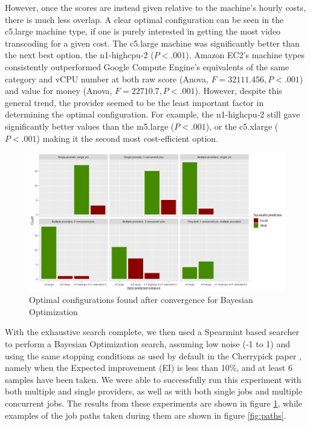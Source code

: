 \documentclass{article}
\begin{document}
However, once the scores are instead given relative to the machine's hourly costs, there is much less overlap. A clear optimal configuration can be seen in the c5.large machine type, if one is purely interested in getting the most video transcoding for a given cost. The c5.large machine was significantly better than the next best option, the n1-highcpu-2 ($P < .001$). Amazon EC2's  machine types consistently outperformed Google Compute Engine's equivalents of the same category and vCPU number at both raw score (Anova, $F = 32111.456, P < .001$) and value for money (Anova, $F = 22710.7, P < .001$). However, despite this general trend, the provider seemed to be the least important factor in determining the optimal configuration. For example, the n1-highcpu-2 still gave significantly better values than the m5.large ($P < .001$), or the c5.xlarge ($P < .001$) making it the second most cost-efficient option. 

\begin{figure}
  \caption{Optimal configurations found after convergence for Bayesian Optimization}
  \label{fig:bo-results}
  \centering
  \includegraphics[scale=0.5]{bo_results}
\end{figure}

With the exhaustive search complete, we then used a Spearmint based searcher to perform a Bayesian Optimization search, assuming low noise (-1 to 1) and using the same stopping conditions as used by default in the Cherrypick paper \cite{Alipourfard2017}, namely when the Expected improvement (EI) is less than 10\%, and at least 6 samples have been taken. We were able to successfully run this experiment with both multiple and single providers, as well as with both single jobs and multiple concurrent jobs. The results from these experiments are shown in figure \ref{fig:bo-results}, while examples of the job paths taken during them are shown in figure \ref{fig:paths}.
\end{document}
